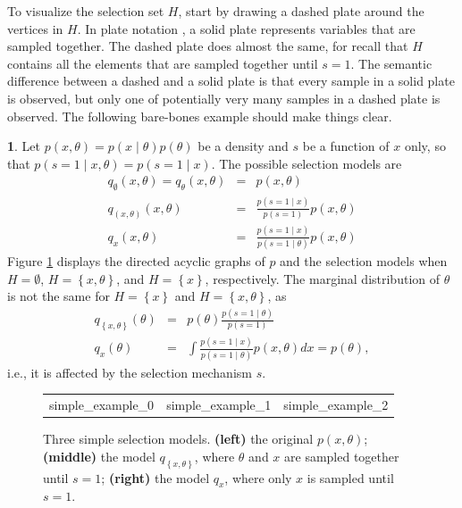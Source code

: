 \documentclass[preprint, authoryear]{elsarticle}
\theoremstyle{plain}
\theoremstyle{definition}
\newtheorem{example}[theorem]{\protect\examplename}
\providecommand{\examplename}{Example}
\begin{document}
To visualize the selection set $H$, start by drawing a dashed plate around the vertices in $H$. In plate notation \citep{buntine1994operations}, a solid plate represents variables that are sampled together. The
dashed plate does almost the same, for recall that $H$ contains all the elements that are sampled together until $s=1$. The semantic difference between a dashed and a solid plate is that every sample in a solid plate is observed, but only one of potentially very many samples in a dashed plate is observed. The following bare-bones example should make things clear.
\begin{example}\label{exa:Marginal density of theta}
Let $p\left(x,\theta\right)=p\left(x\mid\theta\right)p\left(\theta\right)$
be a density and $s$ be a function of $x$ only, so that $p\left(s=1\mid x,\theta\right)=p\left(s=1\mid x\right)$.
The possible selection models are
\begin{eqnarray*}
q_{\emptyset}\left(x,\theta\right) = q_{\theta}\left(x,\theta\right) & = & p\left(x,\theta\right)\\
q_{\left(x,\theta\right)}\left(x,\theta\right) & = & \frac{p\left(s=1\mid x\right)}{p\left(s=1\right)}p\left(x,\theta\right)\\
q_{x}\left(x,\theta\right) & = & \frac{p\left(s=1\mid x\right)}{p\left(s=1\mid\theta\right)}p\left(x,\theta\right)
\end{eqnarray*}
Figure \ref{fig:Plate notation, simple example} displays the directed acyclic graphs of $p$ and the selection models when $H = \emptyset$, $H=\left\{ x,\theta\right\}$, and $H=\left\{ x\right\}$, respectively. The marginal distribution of $\theta$ is not the same for $H=\left\{ x\right\}$ and $H=\left\{ x,\theta\right\} $, as
\begin{eqnarray*}
q_{\left\{ x,\theta\right\} }\left(\theta\right) & = & p\left(\theta\right)\frac{p\left(s=1\mid\theta\right)}{p\left(s=1\right)}\\
q_{x}\left(\theta\right) & = & \int\frac{p\left(s=1\mid x\right)}{p\left(s=1\mid\theta\right)}p\left(x,\theta\right)dx=p\left(\theta\right),
\end{eqnarray*}
i.e., it is affected by the selection mechanism $s$.
\end{example}

\begin{figure}
\begin{center}     
 \begin{tabular}{ccc}   
  {simple_example_0} &   
   {simple_example_1} & 
   {simple_example_2}
 \end{tabular} 
\end{center}

\caption{\label{fig:Plate notation, simple example} Three simple selection models. {\bf (left)} the original $p\left(x,\theta\right)$; {\bf (middle)} the model $q_{\left\{ x,\theta\right\} }$, where $\theta$ and $x$ are
sampled together until $s=1$; {\bf (right)} the model $q_{x}$, where only $x$ is sampled until $s=1$.}
\end{figure}
\end{document}

